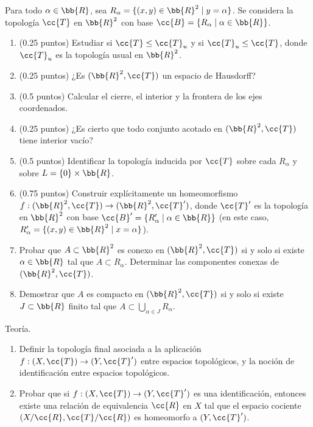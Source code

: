\documentclass[12pt]{article}
\newcommand{\T}[0]{\cc{T}}
\begin{document}
    \begin{ejercicio}
        Para todo $\alpha \in \bb{R}$, sea $R_{\alpha}= \{(x,y)\in \bb{R}^2\mid y=\alpha\}$.
        Se considera la topología $\T$ en $\bb{R}^2$ con base $\cc{B}= \{R_{\alpha}\mid \alpha\in\bb{R}\}$.
        \begin{enumerate}
            \item(0.25 puntos) Estudiar si $\T\leq \T_u$ y si $\T_u \leq \T$, donde $\T_u$ es la topología usual en $\bb{R}^2$.
            \item(0.25 puntos) ¿Es $(\bb{R}^2,\T)$ un espacio de Hausdorff?
            \item(0.5 puntos) Calcular el cierre, el interior y la frontera de los ejes coordenados.
            \item(0.25 puntos) ¿Es cierto que todo conjunto acotado en $(\bb{R}^2,\T)$ tiene interior vacío?
            \item(0.5 puntos) Identificar la topología inducida por $\T$ sobre cada $R_{\alpha}$ y sobre $L=\{0\}\times \bb{R}$.
            \item(0.75 puntos) Construir explícitamente un homeomorfismo $f:(\bb{R}^2,\T)\to (\bb{R}^2,\T')$, donde
            $\T'$ es la topología en $\bb{R}^2$ con base $\cc{B}'= \{R'_{\alpha}\mid \alpha\in\bb{R}\}$ (en este caso, $R'_{\alpha}= \{(x,y)\in \bb{R}^2\mid x=\alpha\}$).

            \item Probar que $A\subset \bb{R}^2$ es conexo en $(\bb{R}^2,\T)$ si y solo si existe $\alpha\in\bb{R}$ tal que $A\subset R_{\alpha}$. Determinar
            las componentes conexas de $(\bb{R}^2,\T)$.
            \item Demostrar que $A$ es compacto en $(\bb{R}^2,\T)$ si y solo si existe $J\subset \bb{R}$ finito tal que
            $A\subset \bigcup\limits_{\alpha\in J}R_{\alpha}$.
        \end{enumerate}
    \end{ejercicio}


    \begin{ejercicio}[3 puntos] Teoría.
        \begin{enumerate}
            \item Definir la topología final asociada a la aplicación $f:(X,\T)\to (Y,\T')$ entre espacios topológicos, y la noción de identificación entre espacios topológicos.
            \item Probar que si $f:(X,\T)\to (Y,\T')$ es una identificación, entonces existe una relación de equivalencia $\cc{R}$ en $X$ tal que el espacio cociente $(X/\cc{R},\T/\cc{R})$ es homeomorfo a $(Y,\T')$.
        \end{enumerate} 
    \end{ejercicio}
\end{document}
